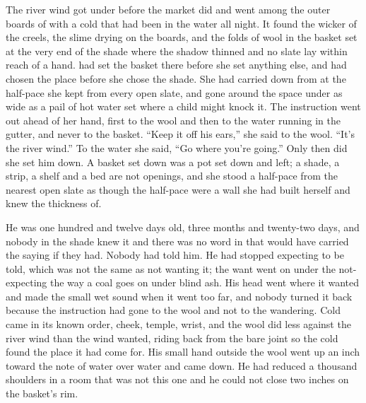 
The river wind got under  before the market did and went among the outer boards of  with a cold that had been in the water all night. It found the wicker of the creels, the slime drying on the boards, and the folds of wool in the basket set at the very end of the shade where the shadow thinned and no slate lay within reach of a hand.  had set the basket there before she set anything else, and had chosen the place before she chose the shade. She had carried  down from  at the half-pace she kept from every open slate, and gone around the space under  as wide as a pail of hot water set where a child might knock it. The instruction went out ahead of her hand, first to the wool and then to the water running in the gutter, and never to the basket. “Keep it off his ears,” she said to the wool. “It's the river wind.” To the water she said, “Go where you're going.” Only then did she set him down. A basket set down was a pot set down and left; a shade, a strip, a shelf and a bed are not openings, and she stood a half-pace from the nearest open slate as though the half-pace were a wall she had built herself and knew the thickness of.

He was one hundred and twelve days old, three months and twenty-two days, and nobody in the shade knew it and there was no word in  that would have carried the saying if they had. Nobody had told him. He had stopped expecting to be told, which was not the same as not wanting it; the want went on under the not-expecting the way a coal goes on under blind ash. His head went where it wanted and made the small wet sound when it went too far, and nobody turned it back because the instruction had gone to the wool and not to the wandering. Cold came in its known order, cheek, temple, wrist, and the wool did less against the river wind than the wind wanted, riding back from the bare joint so the cold found the place it had come for. His small hand outside the wool went up an inch toward the note of water over water and came down. He had reduced a thousand shoulders in a room that was not this one and he could not close two inches on the basket's rim.

